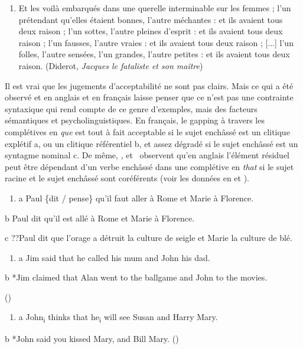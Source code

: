 \begin{enumerate}
\item Et les voilà embarqués dans une querelle interminable sur les femmes ; l'un prétendant qu'elles étaient bonnes, l'autre méchantes : et ils avaient tous deux raison ; l'un sottes, l'autre pleines d'esprit : et ils avaient tous deux raison ; l'un fausses, l'autre vraies : et ils avaient tous deux raison ; [...] l'un folles, l'autre sensées, l'un grandes, l'autre petites : et ils avaient tous deux raison. (Diderot, \textit{Jacques le fataliste et son maître})


\end{enumerate}
Il est vrai que les jugements d'acceptabilité ne sont pas clairs. Mais ce qui a été observé et en anglais et en français laisse penser que ce n'est pas une contrainte syntaxique qui rend compte de ce genre d'exemples, mais des facteurs sémantiques et psycholinguistiques. En français, le gapping à travers les complétives en \textit{que} est tout à fait acceptable si le sujet enchâssé est un clitique explétif a, ou un clitique référentiel b, et assez dégradé si le sujet enchâssé est un syntagme nominal c. De même, \citet[113]{Merchant2001}, \citet{Lasnik2006} et \citet{Repp2009}~observent qu'en anglais l'élément résiduel peut être dépendant d'un verbe enchâssé dans une complétive en \textit{that} si le sujet racine et le sujet enchâssé sont coréférents (voir les données en  et ).


\begin{enumerate}
\item \label{bkm:Ref288750980}a   Paul \{dit / pense\} qu'il faut aller à Rome et Marie à Florence.


\end{enumerate}
b  Paul dit qu'il est allé à Rome et Marie à Florence.

c  ??Paul dit que l'orage a détruit la culture de seigle et Marie la culture de blé.    


\begin{enumerate}
\item \label{bkm:Ref288751323}a   Jim said that he called his mum and John his dad.


\end{enumerate}
b  *Jim claimed that Alan went to the ballgame and John to the movies. 

                        (\citet[12]{Repp2009})  


\begin{enumerate}
\item \label{bkm:Ref288751334}a   John\textsubscript{i} thinks that he\textsubscript{i} will see Susan and Harry Mary.


\end{enumerate}
b  *John said you kissed Mary, and Bill Mary.        (\citet{Lasnik2006})

